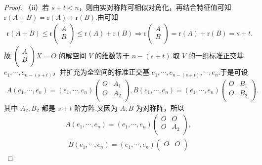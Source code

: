 \documentclass[../../main.tex]{subfiles}%
\begin{document}
\begin{proof}
（ii）若 $s+t<n$，则由实对称阵可相似对角化，再结合特征值可知 $\mathrm{r}\left( A+B \right) =\mathrm{r}\left( A \right) +\mathrm{r}\left( B \right) $.由可知
\begin{align*}
\mathrm{r}\left( A+B \right) \leqslant \mathrm{r}\begin{pmatrix}
A\\
B\\
\end{pmatrix} \leqslant \mathrm{r}\left( A \right) +\mathrm{r}\left( B \right) \Longrightarrow \mathrm{r}\begin{pmatrix}
A\\
B\\
\end{pmatrix} =\mathrm{r}\left( A \right) +\mathrm{r}\left( B \right) =s+t.
\end{align*}
故 $\begin{pmatrix}
A\\
B\\
\end{pmatrix} X=O$ 的解空间 $V$ 的维数等于 $n-\left( s+t \right) $.取 $V$ 的一组标准正交基 $e_1,\cdots ,e_{n-\left( s+t \right)}$，并扩充为全空间的标准正交基 $e_1,\cdots ,e_{n-\left( s+t \right)},\cdots ,e_n$.于是可设
\begin{align*}
A\left( e_1,\cdots ,e_n \right) =\left( e_1,\cdots ,e_n \right) \begin{pmatrix}
O&		A_1\\
O&		A_2\\
\end{pmatrix},B\left( e_1,\cdots ,e_n \right) =\left( e_1,\cdots ,e_n \right) \begin{pmatrix}
O&		B_1\\
O&		B_2\\
\end{pmatrix}.
\end{align*}
其中 $A_2,B_2$ 都是 $s+t$ 阶方阵.又因为 $A,B$ 为对称阵，所以
\begin{align*}
A\left( e_1,\cdots ,e_n \right) =\left( e_1,\cdots ,e_n \right) \begin{pmatrix}
O&		O\\
O&		A_2\\
\end{pmatrix},
\end{align*}
\begin{align*}
B\left( e_1,\cdots ,e_n \right) =\left( e_1,\cdots ,e_n \right) \begin{pmatrix}
O&		O\\

\end{pmatrix}
\end{align*}
\end{proof}
\end{document}
